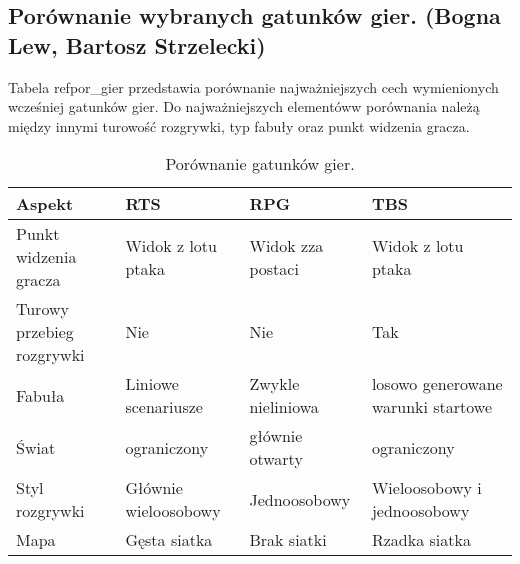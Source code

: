 \subsection{Porównanie wybranych gatunków gier. (Bogna Lew, Bartosz Strzelecki)}
Tabela ref{por_gier} przedstawia porównanie najważniejszych cech wymienionych wcześniej gatunków gier. Do
najważniejszych elementóww porównania należą między innymi turowość rozgrywki, typ fabuły oraz punkt widzenia gracza.

\begin{table}[h]\label{por_gier}
\caption{Porównanie gatunków gier.}
\begin{center}
\begin{tabular}{| m{11em} | m{10em} | m{10em} | m{10em}|} 
 \hline
 Aspekt & RTS & RPG & TBS \\
 \hline \hline
 Punkt widzenia gracza & Widok z lotu ptaka & Widok zza postaci & Widok z lotu ptaka \\
 \hline
 Turowy przebieg rozgrywki & Nie & Nie & Tak \\
 \hline
 Fabuła & Liniowe scenariusze & Zwykle nieliniowa & losowo generowane warunki startowe \\
 \hline
 Świat & ograniczony & głównie otwarty & ograniczony \\
 \hline
 Styl rozgrywki & Głównie wieloosobowy & Jednoosobowy & Wieloosobowy i jednoosobowy \\
 \hline
 Mapa & Gęsta siatka & Brak siatki & Rzadka siatka \\
 \hline
\end{tabular}
\end{center}
\label{fig:teng} 
\end{table}

